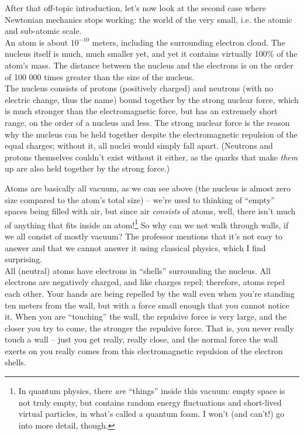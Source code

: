 After that off-topic introduction, let's now look at the second case where Newtonian mechanics stops working: the world of the very small, i.e. the atomic and sub-atomic scale.\\
An atom is about $10^{-10}$ meters, including the surrounding electron cloud. The nucleus itself is much, much smaller yet, and yet it contains virtually 100\% of the atom's mass. The distance between the nucleus and the electrons is on the order of 100 000 times greater than the size of the nucleus.\\
The nucleus consists of protons (positively charged) and neutrons (with no electric change, thus the name) bound together by the strong nuclear force, which is much stronger than the electromagnetic force, but has an extremely short range, on the order of a nucleus and less. The strong nuclear force is the reason why the nucleus can be held together despite the electromagnetic repulsion of the equal charges; without it, all nuclei would simply fall apart. (Neutrons and protons themselves couldn't exist without it either, as the quarks that make \emph{them} up are also held together by the strong force.)

Atoms are basically all vacuum, as we can see above (the nucleus is almost zero size compared to the atom's total size) -- we're used to thinking of ``empty'' spaces being filled with air, but since air \emph{consists} of atoms, well, there isn't much of anything that fits inside an atom!\footnote{In quantum physics, there \emph{are} ``things'' inside this vacuum: empty space is not truly empty, but contains random energy fluctuations and short-lived virtual particles, in what's called a quantum foam. I won't (and can't!) go into more detail, though.}
So why can we not walk through walls, if we all consist of mostly vacuum? The professor mentions that it's not easy to answer and that we cannot answer it using classical physics, which I find surprising.\\
All (neutral) atoms have electrons in ``shells'' surrounding the nucleus. All electrons are negatively charged, and like charges repel; therefore, atoms repel each other. Your hands are being repelled by the wall even when you're standing ten meters from the wall, but with a force small enough that you cannot notice it. When you are ``touching'' the wall, the repulsive force is very large, and the closer you try to come, the stronger the repulsive force. That is, you never really touch a wall -- just you get really, really close, and the normal force the wall exerts on you really comes from this electromagnetic repulsion of the electron shells.

